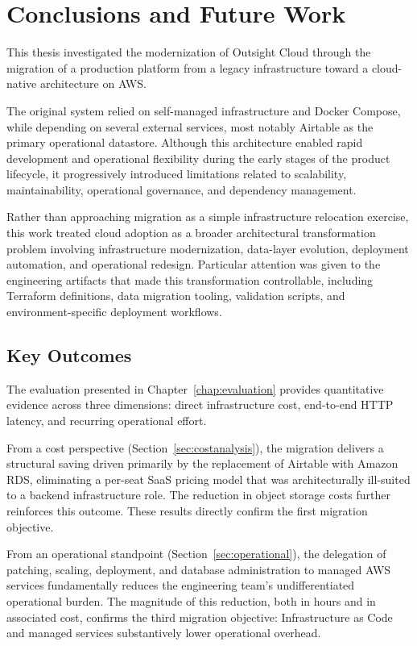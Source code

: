 \chapter{Conclusions and Future Work}
\label{chap:conclusions}

This thesis investigated the modernization of Outsight Cloud through the migration of a production platform from a legacy infrastructure toward a cloud-native architecture on AWS.

The original system relied on self-managed infrastructure and Docker Compose, while depending on several external services, most notably Airtable as the primary operational datastore. Although this architecture enabled rapid development and operational flexibility during the early stages of the product lifecycle, it progressively introduced limitations related to scalability, maintainability, operational governance, and dependency management.

Rather than approaching migration as a simple infrastructure relocation exercise, this work treated cloud adoption as a broader architectural transformation problem involving infrastructure modernization, data-layer evolution, deployment automation, and operational redesign. Particular attention was given to the engineering artifacts that made this transformation controllable, including Terraform definitions, data migration tooling, validation scripts, and environment-specific deployment workflows.

\section{Key Outcomes}

The evaluation presented in Chapter~\ref{chap:evaluation} provides quantitative evidence across three dimensions: direct infrastructure cost, end-to-end HTTP latency, and recurring operational effort.

From a cost perspective (Section~\ref{sec:costanalysis}), the migration delivers a structural saving driven primarily by the replacement of Airtable with Amazon RDS, eliminating a per-seat SaaS pricing model that was architecturally ill-suited to a backend infrastructure role. The reduction in object storage costs further reinforces this outcome. These results directly confirm the first migration objective.

From an operational standpoint (Section~\ref{sec:operational}), the delegation of patching, scaling, deployment, and database administration to managed AWS services fundamentally reduces the engineering team's undifferentiated operational burden. The magnitude of this reduction, both in hours and in associated cost, confirms the third migration objective: Infrastructure as Code and managed services substantively lower operational overhead.

